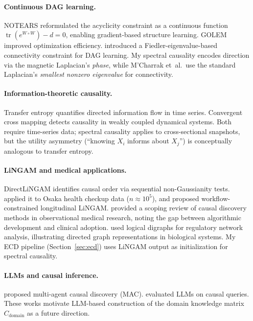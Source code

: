 \documentclass[twoside,11pt]{article}
\DeclareMathOperator{\tr}{tr}
\begin{document}
\paragraph{Continuous DAG learning.}
NOTEARS \citep{Zheng2018} reformulated the acyclicity constraint as a
continuous function $\tr(e^{W\circ W})-d=0$, enabling gradient-based
structure learning.  GOLEM \citep{Ng2020} improved optimization
efficiency.  \citet{Mcharrak2025} introduced a Fiedler-eigenvalue-based
connectivity constraint for DAG learning.  My spectral causality
encodes direction via the magnetic Laplacian's \emph{phase}, while
M'Charrak et~al.\ use the standard Laplacian's \emph{smallest nonzero
eigenvalue} for connectivity.

\paragraph{Information-theoretic causality.}
Transfer entropy \citep{Schreiber2000} quantifies directed information
flow in time series.  Convergent cross mapping \citep{Sugihara2012}
detects causality in weakly coupled dynamical systems.  Both require
time-series data; spectral causality applies to cross-sectional
snapshots, but the utility asymmetry (``knowing $X_i$ informs about
$X_j$'') is conceptually analogous to transfer entropy.

\paragraph{LiNGAM and medical applications.}
DirectLiNGAM \citep{Shimizu2011} identifies causal order via sequential
non-Gaussianity tests.  \citet{Kotoku2020} applied it to Osaka health
checkup data ($n\approx 10^5$), and \citet{Okuda2023} proposed
workflow-constrained longitudinal LiNGAM.  \citet{Liu2024} provided a
scoping review of causal discovery methods in observational medical
research, noting the gap between algorithmic development and clinical
adoption.  \citet{BernalGonzalez2024} used logical digraphs for
regulatory network analysis, illustrating directed graph representations
in biological systems.  My ECD pipeline (Section~\ref{sec:ecd}) uses
LiNGAM output as initialization for spectral causality.

\paragraph{LLMs and causal inference.}
\citet{Le2024} proposed multi-agent causal discovery (MAC).
\citet{Sheth2024} evaluated LLMs on causal queries.  These works
motivate LLM-based construction of the domain knowledge matrix
$C_{\mathrm{domain}}$ as a future direction.
\end{document}
